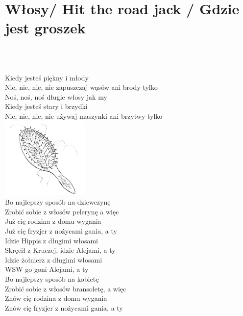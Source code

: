 \documentclass[a5paper, 10pt]{book}
\begin{document}
\section{Włosy/ Hit the road jack / Gdzie jest groszek}\textcolor{lightgray}{\textit{}}\\~\\
\begin{minipage}[t]{0.9\textwidth}
Kiedy jesteś piękny i młody\\
Nie, nie, nie, nie zapuszczaj wąsów ani brody tylko\\

\hspace*{5mm}Noś, noś, noś długie włosy jak my\\

Kiedy jesteś stary i brzydki\\
Nie, nie, nie, nie używaj maszynki ani brzytwy tylko\\

\includegraphics[height=4cm, right]{wlosy.png}\vspace*{-4.1cm}\\
Bo najlepszy sposób na dziewczynę\\
Zrobić sobie z włosów pelerynę a więc\\

Już cię rodzina z domu wygania\\
Już cię fryzjer z nożycami gania, a ty\\

Idzie Hippis z długimi włosami\\
Skręcił z Kruczej, idzie Alejami, a ty\\

Idzie żołnierz z długimi włosami\\
WSW go goni Alejami, a ty\\

Bo najlepszy sposób na kobietę\\
Zrobić sobie z włosów bransoletę, a więc\\

Znów cię rodzina z domu wygania\\
Znów cię fryzjer z nożycami gania, a ty\\


\end{minipage}
\end{document}

